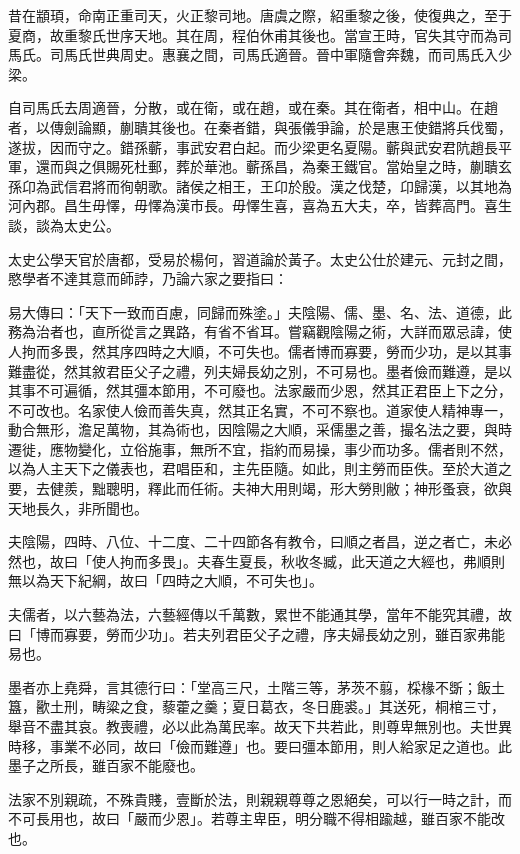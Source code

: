 
\begin{pinyinscope}
昔在顓頊，命南正重司天，火正黎司地。唐虞之際，紹重黎之後，使復典之，至于夏商，故重黎氏世序天地。其在周，程伯休甫其後也。當宣王時，官失其守而為司馬氏。司馬氏世典周史。惠襄之間，司馬氏適晉。晉中軍隨會奔魏，而司馬氏入少梁。

自司馬氏去周適晉，分散，或在衛，或在趙，或在秦。其在衛者，相中山。在趙者，以傳劍論顯，蒯聵其後也。在秦者錯，與張儀爭論，於是惠王使錯將兵伐蜀，遂拔，因而守之。錯孫蘄，事武安君白起。而少梁更名夏陽。蘄與武安君阬趙長平軍，還而與之俱賜死杜郵，葬於華池。蘄孫昌，為秦王鐵官。當始皇之時，蒯聵玄孫卬為武信君將而徇朝歌。諸侯之相王，王卬於殷。漢之伐楚，卬歸漢，以其地為河內郡。昌生毋懌，毋懌為漢市長。毋懌生喜，喜為五大夫，卒，皆葬高門。喜生談，談為太史公。

太史公學天官於唐都，受易於楊何，習道論於黃子。太史公仕於建元、元封之間，愍學者不達其意而師誖，乃論六家之要指曰：

易大傳曰：「天下一致而百慮，同歸而殊塗。」夫陰陽、儒、墨、名、法、道德，此務為治者也，直所從言之異路，有省不省耳。嘗竊觀陰陽之術，大詳而眾忌諱，使人拘而多畏，然其序四時之大順，不可失也。儒者博而寡要，勞而少功，是以其事難盡從，然其敘君臣父子之禮，列夫婦長幼之別，不可易也。墨者儉而難遵，是以其事不可遍循，然其彊本節用，不可廢也。法家嚴而少恩，然其正君臣上下之分，不可改也。名家使人儉而善失真，然其正名實，不可不察也。道家使人精神專一，動合無形，澹足萬物，其為術也，因陰陽之大順，采儒墨之善，撮名法之要，與時遷徙，應物變化，立俗施事，無所不宜，指約而易操，事少而功多。儒者則不然，以為人主天下之儀表也，君唱臣和，主先臣隨。如此，則主勞而臣佚。至於大道之要，去健羨，黜聰明，釋此而任術。夫神大用則竭，形大勞則敝；神形蚤衰，欲與天地長久，非所聞也。

夫陰陽，四時、八位、十二度、二十四節各有教令，曰順之者昌，逆之者亡，未必然也，故曰「使人拘而多畏」。夫春生夏長，秋收冬臧，此天道之大經也，弗順則無以為天下紀綱，故曰「四時之大順，不可失也」。

夫儒者，以六藝為法，六藝經傳以千萬數，累世不能通其學，當年不能究其禮，故曰「博而寡要，勞而少功」。若夫列君臣父子之禮，序夫婦長幼之別，雖百家弗能易也。

墨者亦上堯舜，言其德行曰：「堂高三尺，土階三等，茅茨不翦，棌椽不斲；飯土簋，歠土刑，畴粱之食，藜藿之羹；夏日葛衣，冬日鹿裘。」其送死，桐棺三寸，舉音不盡其哀。教喪禮，必以此為萬民率。故天下共若此，則尊卑無別也。夫世異時移，事業不必同，故曰「儉而難遵」也。要曰彊本節用，則人給家足之道也。此墨子之所長，雖百家不能廢也。

法家不別親疏，不殊貴賤，壹斷於法，則親親尊尊之恩絕矣，可以行一時之計，而不可長用也，故曰「嚴而少恩」。若尊主卑臣，明分職不得相踰越，雖百家不能改也。


\end{pinyinscope}
